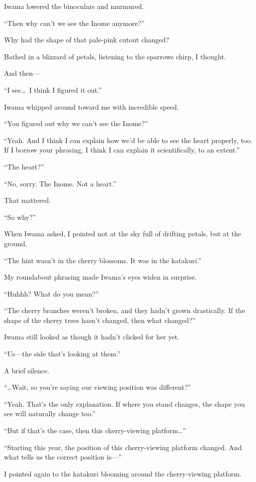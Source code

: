 \documentclass[
    a4paper,
    12pt,
    twoside,
    openany,
    UTF8,
    fontset=windows
]{ctexbook}
\begin{document}
Iwama lowered the binoculars and murmured.

``Then why can't we see the Inome anymore?''

Why had the shape of that pale-pink cutout changed?

Bathed in a blizzard of petals, listening to the sparrows chirp, I thought.

And then---

``I see\dots\ I think I figured it out.''

Iwama whipped around toward me with incredible speed.

``You figured out why we can't see the Inome?''

``Yeah. And I think I can explain how we'd be able to see the heart properly, too. If I borrow your phrasing, I think I can explain it scientifically, to an extent.''

``The heart?''

``No, sorry. The Inome. Not a heart.''

That mattered.

``So why?''

When Iwama asked, I pointed not at the sky full of drifting petals, but at the ground.

``The hint wasn't in the cherry blossoms. It was in the katakuri.''

My roundabout phrasing made Iwama's eyes widen in surprise.

``Huhhh? What do you mean?''

``The cherry branches weren't broken, and they hadn't grown drastically. If the shape of the cherry trees hasn't changed, then what changed?''

Iwama still looked as though it hadn't clicked for her yet.

``Us---the side that's looking at them.''

A brief silence.

``\dots Wait, so you're saying our viewing position was different?''

``Yeah. That's the only explanation. If where you stand changes, the shape you see will naturally change too.''

``But if that's the case, then this cherry-viewing platform\dots''

``Starting this year, the position of this cherry-viewing platform changed. And what tells us the correct position is---''

I pointed again to the katakuri blooming around the cherry-viewing platform.
\end{document}
